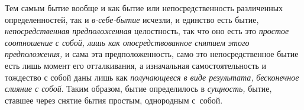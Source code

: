 Тем самым бытие вообще и как бытие или непосредственность различенных
определенностей, так и {\em в-себе-бытие} исчезли, и единство есть бытие,
{\em непосредственная предположенная} целостность, так что оно есть это
{\em простое соотношение с собой, лишь как опосредствованное снятием
этого предположения,} и сама эта предположенность, само это непосредственное
бытие есть лишь момент его отталкивания, а изначальная самостоятельность и
тождество с собой даны лишь как {\em получающееся в виде результата,}
{\em бесконечное слияние с собой}. Таким образом, бытие определилось в
{\em сущность,} бытие, ставшее через снятие бытия простым, однородным с~собой.
